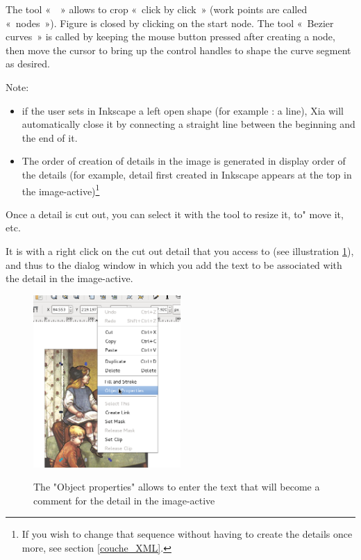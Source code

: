 The tool «~~» 
allows to crop «~click by click~» (work points are called 
«~nodes~»).  Figure is closed by clicking on the start node. 
The tool «~Bezier curves~» is called by keeping the mouse button pressed 
after creating a node, then move the cursor to bring up the control handles 
to shape the curve segment as desired.

Note:
\begin{itemize}
 \item if the user sets in Inkscape a left open shape (for
example : a line), Xia will automatically close it  by connecting a 
 straight line between the beginning and the end of it.
 \item The order of creation of details in the image is generated in display 
order of the details (for example, detail first created in
Inkscape appears at the top in the image-active)\footnote{If you wish to 
change that sequence without having to create the details once more, see 
section 
\ref{couche_XML}.}
\end{itemize}

Once a detail is cut out, you can select it with the tool  
 to resize it, to" 
move it, etc.

It is with a right click on the cut out detail that you access to 
 (see illustration 
\ref{proprietes_objet}), and 
thus to the dialog window in which you add the text to be associated with the 
detail in the image-active.

\begin{figure}[htp]
 \centering
 \caption{The "Object properties" allows to enter the text that will become a 
 comment for the detail in the image-active}
 \includegraphics[width=0.5\textwidth]{./images/proprietes_objet}
 \label{proprietes_objet}
\end{figure}

